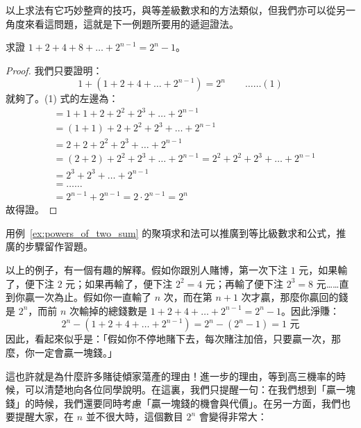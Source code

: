 以上求法有它巧妙整齊的技巧，與等差級數求和的方法類似，但我們亦可以從另一角度來看這問題，這就是下一例題所要用的遞迴證法。

\begin{example}\label{ex:powers_of_two_sum}
求證 $1+2+4+8+\dots+2^{n-1} = 2^n - 1$。
\end{example}

\begin{proof}
我們只要證明：
\begin{equation}\label{eq:two_pow_recur}
  1 + (1+2+4+\dots+2^{n-1}) = 2^n \qquad \dots\dots (1)
\end{equation}
就夠了。(1) 式的左邊為：
\begin{align*}
  &= 1 + 1 + 2 + 2^2 + 2^3 + \dots + 2^{n-1} \\
  &= (1+1) + 2 + 2^2 + 2^3 + \dots + 2^{n-1} \\
  &= 2 + 2 + 2^2 + 2^3 + \dots + 2^{n-1} \\
  &= (2+2) + 2^2 + 2^3 + \dots + 2^{n-1} = 2^2 + 2^2 + 2^3 + \dots + 2^{n-1} \\
  &= 2^3 + 2^3 + \dots + 2^{n-1} \\
  &= \dots\dots \\
  &= 2^{n-1} + 2^{n-1} = 2 \cdot 2^{n-1} = 2^n
\end{align*}
故得證。
\end{proof}

用例~\ref{ex:powers_of_two_sum} 的聚項求和法可以推廣到等比級數求和公式，推廣的步驟留作習題。

以上的例子，有一個有趣的解釋。假如你跟別人賭博，第一次下注 $1$ 元，如果輸了，便下注 $2$ 元；如果再輸了，便下注 $2^2 = 4$ 元；再輸了便下注 $2^3 = 8$ 元……直到你贏一次為止。假如你一直輸了 $n$ 次，而在第 $n+1$ 次才贏，那麼你贏回的錢是 $2^n$，而前 $n$ 次輸掉的總錢數是 $1+2+4+\dots+2^{n-1} = 2^n - 1$。因此淨賺：
\begin{equation*}
  2^n - (1+2+4+\dots+2^{n-1}) = 2^n - (2^n - 1) = 1 \text{ 元}
\end{equation*}
因此，看起來似乎是：「假如你不停地賭下去，每次賭注加倍，只要贏一次，那麼，你一定會贏一塊錢。」

這也許就是為什麼許多賭徒傾家蕩產的理由！進一步的理由，等到高三機率的時候，可以清楚地向各位同學說明。在這裏，我們只提醒一句：在我們想到「贏一塊錢」的時候，我們還要同時考慮「贏一塊錢的機會與代價」。在另一方面，我們也要提醒大家，在 $n$ 並不很大時，這個數目 $2^n$ 會變得非常大：

